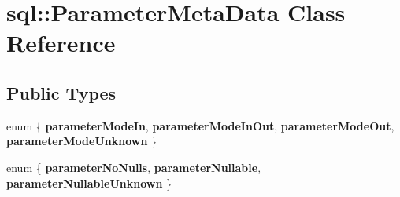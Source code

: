 \hypertarget{classsql_1_1_parameter_meta_data}{}\section{sql\+:\+:Parameter\+Meta\+Data Class Reference}
\label{classsql_1_1_parameter_meta_data}
\subsection*{Public Types}
\begin{DoxyCompactItemize}
\item 
\hypertarget{classsql_1_1_parameter_meta_data_ae0ffcd0552843910d5b6e0200740805e}{}\label{classsql_1_1_parameter_meta_data_ae0ffcd0552843910d5b6e0200740805e} 
enum \{ {\bfseries parameter\+Mode\+In}, 
{\bfseries parameter\+Mode\+In\+Out}, 
{\bfseries parameter\+Mode\+Out}, 
{\bfseries parameter\+Mode\+Unknown}
 \}
\item 
\hypertarget{classsql_1_1_parameter_meta_data_aad2c73029b4d51ee6f27890c213ab425}{}\label{classsql_1_1_parameter_meta_data_aad2c73029b4d51ee6f27890c213ab425} 
enum \{ {\bfseries parameter\+No\+Nulls}, 
{\bfseries parameter\+Nullable}, 
{\bfseries parameter\+Nullable\+Unknown}
 \}
\end{DoxyCompactItemize}
